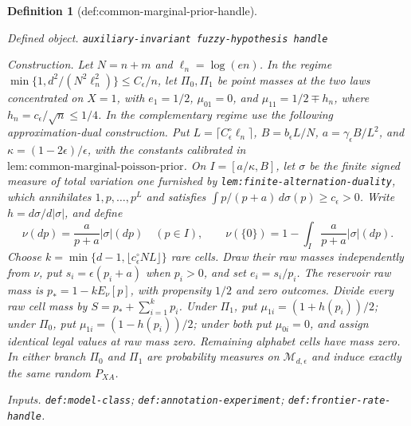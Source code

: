 \documentclass{article}
\newtheorem{definition}{Definition}
\begin{document}
\begin{definition}[def:common-marginal-prior-handle]\label{def:common-marginal-prior-handle}
\par\smallskip\noindent\emph{Defined object.} \texttt{auxiliary-\allowbreak{}invariant fuzzy-\allowbreak{}hypothesis handle}
\par\smallskip\noindent\emph{Construction.} Let \(N=n+m\) and \(\ell_n=\log(en)\).  In the regime \(\min\{1,d^2/(N^2\ell_n^2)\}\le C_\epsilon/n\), let \(\Pi_0,\Pi_1\) be point masses at the two laws concentrated on \(X=1\), with \(e_1=1/2\), \(\mu_{01}=0\), and \(\mu_{11}=1/2\mp h_n\), where \(h_n=c_\epsilon/\sqrt n\le1/4\).  In the complementary regime use the following approximation-dual construction.  Put \(L=\lceil C_\epsilon^\circ\ell_n\rceil\), \(B=b_\epsilon L/N\), \(a=\gamma_\epsilon B/L^2\), and \(\kappa=(1-2\epsilon)/\epsilon\), with the constants calibrated in \(\mathrm{lem:common\mbox{-}marginal\mbox{-}poisson\mbox{-}prior}\).  On \(I=[a/\kappa,B]\), let \(\sigma\) be the finite signed measure of total variation one furnished by \texttt{lem:finite-alternation-duality}, which annihilates \(1,p,\ldots,p^L\) and satisfies \(\int p/(p+a)\,d\sigma(p)\ge c_\epsilon>0\).  Write \(h=d\sigma/d|\sigma|\), and define
\[
 \nu(dp)=\frac{a}{p+a}|\sigma|(dp)\quad(p\in I),
 \qquad
 \nu(\{0\})=1-\int_I\frac{a}{p+a}|\sigma|(dp).
\]
Choose \(k=\min\{d-1,\lfloor c_\epsilon^\circ NL\rfloor\}\) rare cells.  Draw their raw masses independently from \(\nu\), put \(s_i=\epsilon(p_i+a)\) when \(p_i>0\), and set \(e_i=s_i/p_i\).  The reservoir raw mass is \(p_*=1-kE_\nu[p]\), with propensity \(1/2\) and zero outcomes.  Divide every raw cell mass by \(S=p_*+\sum_{i=1}^kp_i\).  Under \(\Pi_1\), put \(\mu_{1i}=(1+h(p_i))/2\); under \(\Pi_0\), put \(\mu_{1i}=(1-h(p_i))/2\); under both put \(\mu_{0i}=0\), and assign identical legal values at raw mass zero.  Remaining alphabet cells have mass zero.  In either branch \(\Pi_0\) and \(\Pi_1\) are probability measures on \(\mathcal M_{d,\epsilon}\) and induce exactly the same random \(P_{XA}\).
\par\smallskip\noindent\emph{Inputs.} \texttt{def:\allowbreak{}model-\allowbreak{}class}; \texttt{def:\allowbreak{}annotation-\allowbreak{}experiment}; \texttt{def:\allowbreak{}frontier-\allowbreak{}rate-\allowbreak{}handle}.
\end{definition}
\end{document}
